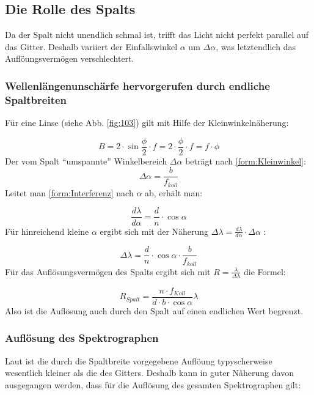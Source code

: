 \subsection{Die Rolle des Spalts}
Da der Spalt nicht unendlich schmal ist, trifft das Licht nicht perfekt parallel auf das Gitter. Deshalb variiert der Einfallswinkel $ \alpha $ um $ \Delta \alpha $, was letztendlich das Auflöungsvermögen verschlechtert.

\subsubsection{Wellenlängenunschärfe hervorgerufen durch endliche Spaltbreiten}
Für eine Linse (siehe Abb. \ref{fig:103}) gilt mit Hilfe der Kleinwinkelnäherung:

\begin{equation}
B = 2\cdot \sin{\frac{\phi}{2}} \cdot f = 2 \cdot \frac{\phi}{2} \cdot f = f \cdot \phi
\label{form:Kleinwinkel}
\end{equation}
Der vom Spalt \enquote{umspannte} Winkelbereich $\Delta \alpha $ beträgt nach \eqref{form:Kleinwinkel}:
\begin{equation}
\Delta \alpha = \frac{b}{f_{koll}}
\end{equation}
Leitet man \eqref{form:Interferenz} nach $ \alpha $ ab, erhält man:

\begin{equation}
\frac{d \lambda}{d \alpha} = \frac{d}{n} \cdot \cos{\alpha}
\end{equation}
Für hinreichend kleine $\alpha$ ergibt sich mit der Näherung $ \Delta \lambda = \frac{d\lambda}{d\alpha} \cdot \Delta \alpha $ :

\begin{equation}
\Delta \lambda = \frac{d}{n} \cdot \cos{\alpha} \cdot \frac{b}{f_{koll}}
\end{equation} 
Für das Auflösungsvermögen des Spalts ergibt sich mit $ R = \frac{\lambda}{\Delta \lambda} $ die Formel:

\begin{equation}
R_{Spalt} = \frac{n \cdot f_{Koll}}{d \cdot b \cdot \cos \alpha} \lambda
\end{equation}
Also ist die Auflösung auch durch den Spalt auf einen endlichen Wert begrenzt.

\subsubsection{Auflösung des Spektrographen}
Laut \cite{ronomischesPraktikum} ist die durch die Spaltbreite vorgegebene Auflöung typyscherweise wesentlich kleiner als die des Gitters. Deshalb kann in guter Näherung davon ausgegangen werden, dass für die Auflösung des gesamten Spektrographen gilt:

